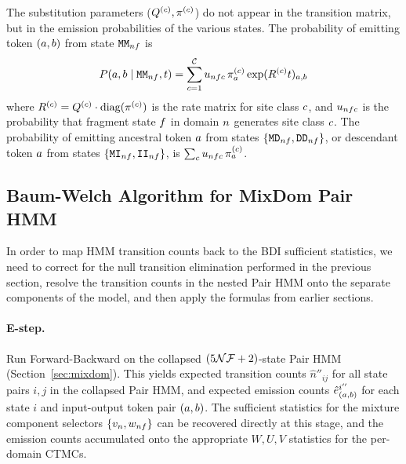 
The substitution parameters ($Q^{(c)}, \pi^{(c)}$)
do not appear in the transition matrix, but in the emission probabilities of the various states.
The probability of emitting token $(a,b)$ from state ${\tt M}{\tt M}_{nf}$ is
\begin{equation}
\label{eq:match-emission}
P(a,b \mid {\tt M}{\tt M}_{nf}, t)
= \sum_{c=1}^{\mathcal{C}} u_{nfc}\,
  \pi^{(c)}_a \exp(R^{(c)} t)_{a,b}
\end{equation}
where $R^{(c)} = Q^{(c)} \cdot {\mbox{diag}}(\pi^{(c)})$ is the rate matrix for site class $c$,
and $u_{nfc}$ is the probability that fragment state $f$ in domain $n$
generates site class $c$.
The probability of emitting ancestral token $a$ from states $\{ {\tt M}{\tt D}_{nf}, {\tt D}{\tt D}_{nf} \}$, or descendant token $a$ from states $\{ {\tt M}{\tt I}_{nf}, {\tt I}{\tt I}_{nf} \}$,
is $\sum_c u_{nfc}\, \pi^{(c)}_a$.


\subsection{Baum-Welch Algorithm for MixDom Pair HMM}
\label{sec:bw-mixdom}

In order to map HMM transition counts back to the BDI sufficient statistics, we need to correct for the null transition elimination performed in the previous section,
resolve the transition counts in the nested Pair HMM onto the separate components of the model,
and then apply the formulas from earlier sections.

\paragraph{E-step.}
Run Forward-Backward on the collapsed $(5\mathcal{N}\mathcal{F}+2)$-state Pair HMM (Section~\ref{sec:mixdom}).
This yields expected transition counts $\hat{n}''_{ij}$ for all state pairs $i,j$ in the collapsed Pair HMM,
and expected emission counts $\hat{e}^{i''}_{(a,b)}$ for each state $i$ and input-output token pair $(a,b)$.
The sufficient statistics for the mixture component selectors $\{ v_n, w_{nf} \}$ can be recovered directly at this stage,
and the emission counts accumulated onto the appropriate $W, U, V$ statistics for the per-domain CTMCs.

